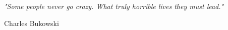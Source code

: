 \pagestyle{empty}

\null\vfill
\textit{"Some people never go crazy. What truly horrible lives they must lead."}

\begin{flushright}
Charles Bukowski
\end{flushright}

\vfill\vfill\vfill\vfill\vfill\vfill\null
\cleardoublepage 